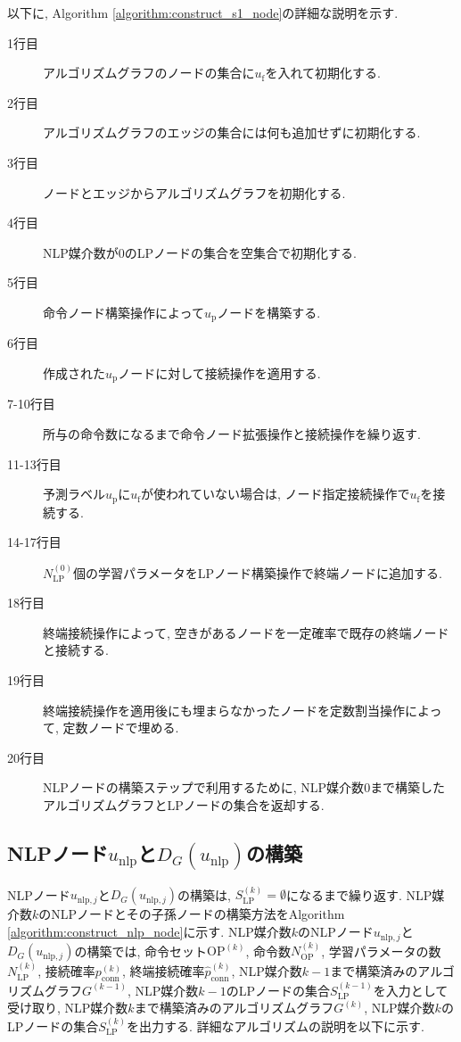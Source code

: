 \documentclass[11pt,oneside,openany,report]{jsbook}
\begin{document}
以下に, Algorithm \ref{algorithm:construct_s1_node}の詳細な説明を示す.

\begin{description}
  \item[1行目] アルゴリズムグラフのノードの集合に$u_\mathrm{f}$を入れて初期化する.
  \item[2行目] アルゴリズムグラフのエッジの集合には何も追加せずに初期化する.
  \item[3行目] ノードとエッジからアルゴリズムグラフを初期化する.
  \item[4行目] NLP媒介数が0のLPノードの集合を空集合で初期化する.
  \item[5行目] 命令ノード構築操作によって$u_\mathrm{p}$ノードを構築する.
  \item[6行目] 作成された$u_\mathrm{p}$ノードに対して接続操作を適用する.
  \item[7-10行目] 所与の命令数になるまで命令ノード拡張操作と接続操作を繰り返す.
  \item[11-13行目] 予測ラベル$u_\mathrm{p}$に$u_\mathrm{f}$が使われていない場合は, ノード指定接続操作で$u_\mathrm{f}$を接続する.
  \item[14-17行目] $N_\mathrm{LP}^{(0)}$個の学習パラメータをLPノード構築操作で終端ノードに追加する.
  \item[18行目] 終端接続操作によって, 空きがあるノードを一定確率で既存の終端ノードと接続する.
  \item[19行目] 終端接続操作を適用後にも埋まらなかったノードを定数割当操作によって, 定数ノードで埋める.
  \item[20行目] NLPノードの構築ステップで利用するために, NLP媒介数$0$まで構築したアルゴリズムグラフとLPノードの集合を返却する.
\end{description}

\subsection{NLPノード$u_\mathrm{nlp}$と$D_G(u_\mathrm{nlp})$の構築} \label{subsec:proposed:initialization:nlp}

NLPノード$u_{\mathrm{nlp},j}$と$D_G(u_{\mathrm{nlp},j})$の構築は, $S_\mathrm{LP}^{(k)} = \emptyset$になるまで繰り返す. NLP媒介数$k$のNLPノードとその子孫ノードの構築方法をAlgorithm \ref{algorithm:construct_nlp_node}に示す. NLP媒介数$k$のNLPノード$u_{\mathrm{nlp},j}$と$D_G(u_{\mathrm{nlp},j})$の構築では, 命令セット$\mathrm{OP}^{(k)}$, 命令数$N_{\mathrm{OP}}^{(k)}$, 学習パラメータの数$N_{\mathrm{LP}}^{(k)}$, 接続確率$p^{(k)}_\mathrm{conn}$, 終端接続確率$\hat{p}^{(k)}_\mathrm{conn}$, NLP媒介数$k-1$まで構築済みのアルゴリズムグラフ$G^{(k-1)}$, NLP媒介数$k-1$のLPノードの集合$S_\mathrm{LP}^{(k-1)}$を入力として受け取り, NLP媒介数$k$まで構築済みのアルゴリズムグラフ$G^{(k)}$, NLP媒介数$k$のLPノードの集合$S_\mathrm{LP}^{(k)}$を出力する. 詳細なアルゴリズムの説明を以下に示す.
\end{document}
